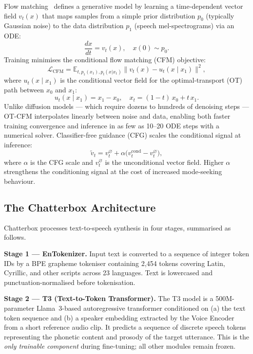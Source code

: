 \documentclass[conference]{IEEEtran}
\begin{document}
Flow matching~\cite{f5tts} defines a generative model by learning a
time-dependent vector field $v_t(x)$ that maps samples from a simple
prior distribution $p_0$ (typically Gaussian noise) to the data
distribution $p_1$ (speech mel-spectrograms) via an ODE:
\begin{equation}
  \frac{dx}{dt} = v_t(x), \quad x(0) \sim p_0.
\end{equation}
Training minimises the conditional flow matching (CFM) objective:
\begin{equation}
  \mathcal{L}_{\text{CFM}} =
    \mathbb{E}_{t,p_1(x_1),p_t(x|x_1)}
    \bigl\| v_t(x) - u_t(x \mid x_1) \bigr\|^2,
\end{equation}
where $u_t(x \mid x_1)$ is the conditional vector field for the
optimal-transport (OT) path between $x_0$ and $x_1$:
\begin{equation}
  u_t(x \mid x_1) = x_1 - x_0, \quad
  x_t = (1-t)\,x_0 + t\,x_1.
\end{equation}
Unlike diffusion models — which require dozens to hundreds of
denoising steps — OT-CFM interpolates linearly between noise and
data, enabling both faster training convergence and inference in as
few as 10--20 ODE steps with a numerical solver.
Classifier-free guidance (CFG) scales the conditional signal at
inference:
\begin{equation}
  \tilde{v}_t = v_t^{\varnothing} +
    \alpha \bigl(v_t^{\text{cond}} - v_t^{\varnothing}\bigr),
\end{equation}
where $\alpha$ is the CFG scale and $v_t^{\varnothing}$ is the
unconditional vector field.
Higher $\alpha$ strengthens the conditioning signal at the cost of
increased mode-seeking behaviour.

\subsection{The Chatterbox Architecture}

Chatterbox processes text-to-speech synthesis in four stages,
summarised as follows.

\textbf{Stage 1 — EnTokenizer.}
Input text is converted to a sequence of integer token IDs by a
BPE grapheme tokeniser containing 2,454 tokens covering Latin,
Cyrillic, and other scripts across 23 languages.
Text is lowercased and punctuation-normalised before tokenisation.

\textbf{Stage 2 — T3 (Text-to-Token Transformer).}
The T3 model is a 500M-parameter Llama~3-based autoregressive
transformer conditioned on (a) the text token sequence and (b) a
speaker embedding extracted by the Voice Encoder from a short
reference audio clip.
It predicts a sequence of discrete speech tokens representing the
phonetic content and prosody of the target utterance.
This is the \emph{only trainable component} during fine-tuning; all
other modules remain frozen.
\end{document}
